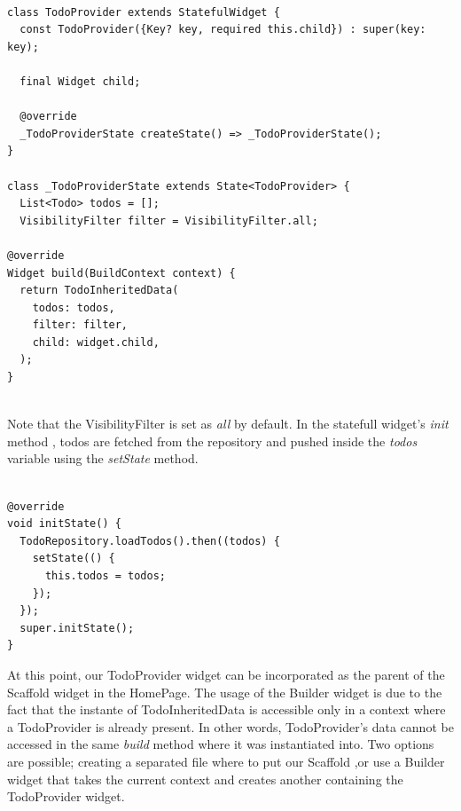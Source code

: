 \begin{code}
 \mbox{}

\label{code:2.18}
\begin{verbatim}

class TodoProvider extends StatefulWidget {
  const TodoProvider({Key? key, required this.child}) : super(key: key);

  final Widget child;

  @override
  _TodoProviderState createState() => _TodoProviderState();
}

class _TodoProviderState extends State<TodoProvider> {
  List<Todo> todos = [];
  VisibilityFilter filter = VisibilityFilter.all;

@override
Widget build(BuildContext context) {
  return TodoInheritedData(
    todos: todos,
    filter: filter,
    child: widget.child,
  );
}
\end{verbatim}
\end{code}
\mbox{}\\
Note that the VisibilityFilter is set as \textit{all} by default.
In the statefull widget's \textit{init} method , todos are fetched from the repository and pushed inside the \textit{todos} variable using the \textit{setState} method.
\mbox{}\\
\begin{code}
 \mbox{}

\label{code:2.19}
\begin{verbatim}

@override
void initState() {
  TodoRepository.loadTodos().then((todos) {
    setState(() {
      this.todos = todos;
    });
  });
  super.initState();
}
\end{verbatim}
\end{code}
\mbox{}
At this point, our TodoProvider widget can be incorporated as the parent of the Scaffold widget in the HomePage. The usage of the Builder widget is due to the fact that the instante of TodoInheritedData is accessible only in a context where a TodoProvider is already present. In other words, TodoProvider’s data cannot be accessed in the same \textit{build } method where it was instantiated into. Two options are possible; creating a separated file where to put our Scaffold ,or use a Builder widget that takes the current context and creates another containing the TodoProvider widget.
\mbox{}\\
